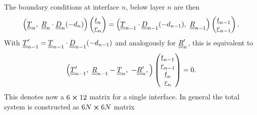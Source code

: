 The boundary conditions at interface $n$, below layer $n$ are then
\begin{equation}
    \left(\uuline{T}_n,\ \uuline{R}_n\cdot \uuline{D}_n(-d_{n}) \right)
    \begin{pmatrix} \uline{t}_n \\ \uline{r}_n \end{pmatrix} =
    \left( \uuline{T}_{n-1} \cdot \uuline{D}_{n-1}(-d_{n-1}),\
    \uuline{R}_{n-1} \right)
    \begin{pmatrix} \uline{t}_{n-1} \\ \uline{r}_{n-1} \end{pmatrix}.
\end{equation}
With $\underline{\underline{T}}_{n-1}^\prime = \underline{\underline{T}}_{n-1} \cdot
    \underline{\underline{D}}_{n-1}(-d_{n-1})$ and analogously for $\underline{\underline{R}}_n^\prime$, this
is equivalent to
\begin{equation}
    \left(\uuline{T}_{n-1}^\prime,\ \uuline{R}_{n-1}
    -\uuline{T}_n,\ -\uuline{R}_n^\prime,\right)
    \begin{pmatrix} \uline{t}_{n-1} \\ \uline{r}_{n-1} \\  \uline{t}_n \\
        \uline{r}_n\end{pmatrix} = 0.
\end{equation}
This denotes now a $6\cross 12$ matrix for a single interface. In general the
total
system is constructed as $6N \cross 6N$ matrix
